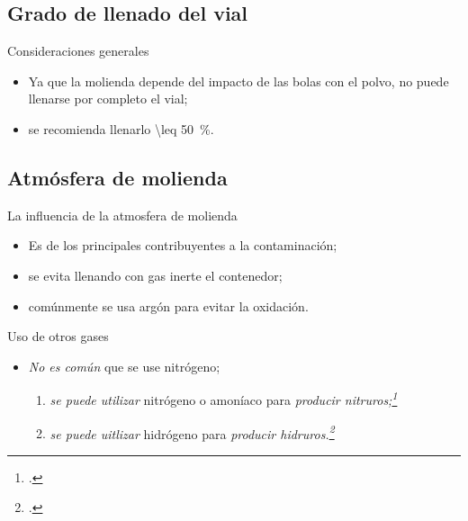 \documentclass[%
spanish,
progressbar=head,
subsectionpage,
aspectratio=169
]{beamer}
\begin{document}
\subsection{Grado de llenado del vial}

\begin{frame}{Consideraciones generales}
    \begin{itemize}
        \item Ya que la molienda depende del impacto de las bolas con el polvo, no puede llenarse por completo el vial;
        \item se recomienda llenarlo \qty{\leq 50}{\percent}.
    \end{itemize}
\end{frame}

\subsection{Atmósfera de molienda}

\begin{frame}{La influencia de la atmosfera de molienda}
    \begin{itemize}
        \item Es de los principales contribuyentes a la contaminación;
        \item se evita llenando con gas inerte el contenedor;
        \item comúnmente se usa argón para evitar la oxidación.
    \end{itemize}
\end{frame}

\begin{frame}{Uso de otros gases}
    \begin{itemize}
        \item \emph{No es común} que se use nitrógeno;
            \begin{enumerate}
                \item \emph{se puede utilizar} nitrógeno o amoníaco para \emph{producir nitruros;\footcite{calkaSynthesisNitridesMechanical1992}}
                \item \emph{se puede uitlizar} hidrógeno para \emph{producir hidruros.\footcite{chenHydridingReactionsInduced1996}}
            \end{enumerate} 
    \end{itemize}
\end{frame}
\end{document}
